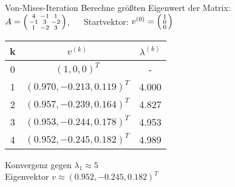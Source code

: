 \begin{example2}{Von-Mises-Iteration}
Berechne größten Eigenwert der Matrix:
\vspace{2mm}\\
$A = \begin{psmallmatrix}
4 & -1 & 1\\
-1 & 3 & -2\\
1 & -2 & 3
\end{psmallmatrix}$, $\quad$
Startvektor: $v^{(0)} = \begin{psmallmatrix}1\\ 0\\ 0\end{psmallmatrix}$

\begin{center}
\begin{tabular}{c|c|c}
k & $v^{(k)}$ & $\lambda^{(k)}$ \\\hline
0 & $(1, 0, 0)^T$ & -\\
1 & $(0.970, -0.213, 0.119)^T$ & 4.000\\
2 & $(0.957, -0.239, 0.164)^T$ & 4.827\\
3 & $(0.953, -0.244, 0.178)^T$ & 4.953\\
4 & $(0.952, -0.245, 0.182)^T$ & 4.989
\end{tabular}
\end{center}

Konvergenz gegen $\lambda_1 \approx 5$ \\ Eigenvektor $v \approx (0.952, -0.245, 0.182)^T$
\end{example2}

